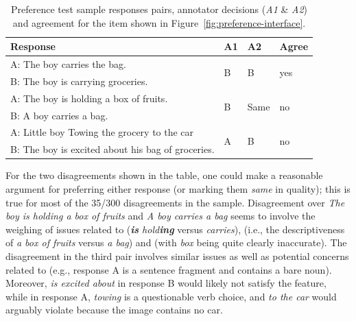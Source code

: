 \begin{table}[htb!]
\begin{center}
\begin{tabular}{|l|l|l|l|}
\hline
 Response & A1 & A2 & Agree \\
\hline
\hline
A: The boy carries the bag. & \multirow{2}{*}{B} & \multirow{2}{*}{B} & \multirow{2}{*}{yes} \\
\cline{1-1}
B: The boy is carrying groceries. & & & \\
\hline
\hline
A: The boy is holding a box of fruits. & \multirow{2}{*}{B} & \multirow{2}{*}{Same} & \multirow{2}{*}{no} \\
\cline{1-1}
B: A boy carries a bag. & & & \\
\hline
\hline
A: Little boy Towing the grocery to the car & \multirow{2}{*}{A} & \multirow{2}{*}{B} & \multirow{2}{*}{no} \\
\cline{1-1}
B: The boy is excited about his bag of groceries. & & & \\
\hline
\end{tabular}
\caption{\label{tab:preference-example-pairs} Preference test sample responses pairs, annotator decisions (\textit{A1} \& \textit{A2}) and agreement for the item shown in Figure~\ref{fig:preference-interface}.}
\end{center}
\end{table}

For the two disagreements shown in the table, one could make a reasonable argument for preferring either response (or marking them \textit{same} in quality); this is true for  most of the 35/300 disagreements in the sample. Disagreement over \textit{The boy is holding a box of fruits} and \textit{A boy carries a bag} seems to involve the weighing of issues related to  (\textit{\textbf{is} hold\textbf{ing}} versus \textit{carries}),  (i.e., the descriptiveness of \textit{a box of fruits} versus \textit{a bag}) and  (with \textit{box} being quite clearly inaccurate). The disagreement in the third pair involves similar  issues as well as potential concerns related to  (e.g., response A is a sentence fragment and contains a bare noun). Moreover, \textit{is excited about} in response B would likely not satisfy the  feature, while in response A, \textit{towing} is a questionable verb choice, and \textit{to the car} would arguably violate  because the image contains no car.


